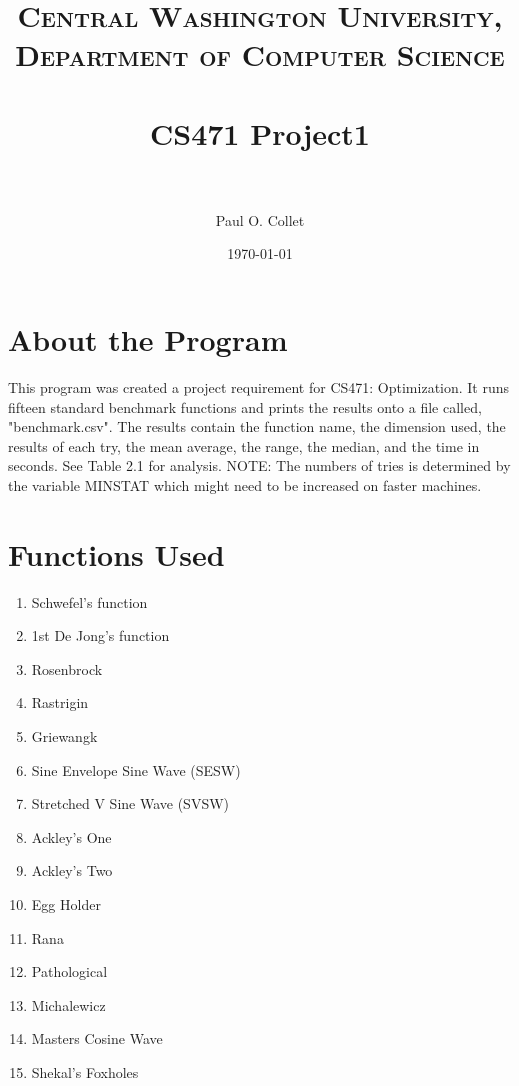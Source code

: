 \documentclass[paper=a4, fontsize=11pt]{scrartcl} %
\title{	
\normalfont \normalsize 
\textsc{Central Washington University, Department of Computer Science} \\ [25pt] 
\horrule{0.5pt} \\[0.4cm] %
\huge CS471 Project1 \\ %
\horrule{2pt} \\[0.5cm] %
}
\author{Paul O. Collet} %
\date{\normalsize\today} %
\numberwithin{equation}{section} %
\numberwithin{figure}{section} %
\numberwithin{table}{section} %
\begin{document}
\maketitle %

\section{About the Program}

This program was created a project requirement for CS471: Optimization. It runs fifteen standard benchmark functions and prints the results onto a file called, "benchmark.csv". The results contain     the function name, the dimension used, the results of each try, the mean average, the range, the median, and the time in seconds. See Table 2.1 for analysis. NOTE: The numbers of tries is determined by the variable MINSTAT which might need to be increased on faster machines.



\section{Functions Used}

\begin{enumerate}
\item Schwefel's function
\item 1st De Jong's function
\item Rosenbrock
\item Rastrigin
\item Griewangk
\item Sine Envelope Sine Wave (SESW)
\item Stretched V Sine Wave (SVSW)
\item Ackley's One
\item Ackley's Two
\item Egg Holder
\item Rana
\item Pathological
\item Michalewicz
\item Masters Cosine Wave
\item Shekal's Foxholes


\end{enumerate}
\end{document}
